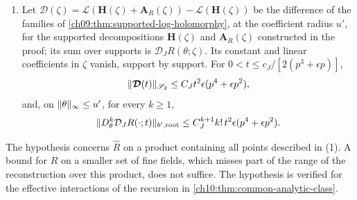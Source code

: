 \begin{lemma}
\begin{enumerate}
\item Let $\boldsymbol{\mathcal D}(\zeta)=\boldsymbol{\mathcal L}(\boldsymbol H(\zeta)+\boldsymbol A_R(\zeta))-\boldsymbol{\mathcal L}(\boldsymbol H(\zeta))$ be the difference of the families of \cref{ch09:thm:supported-log-holomorphy}, at the coefficient radius $u'$, for the supported decompositions $\boldsymbol H(\zeta)$ and $\boldsymbol A_R(\zeta)$ constructed in the proof; its sum over supports is $\mathcal D_JR(\theta;\zeta)$. Its constant and linear coefficients in $\zeta$ vanish, support by support. For $0<t\le c_J/[2(p^3+\epsilon p)]$,
\[
 \lVert \boldsymbol{\mathcal D}(t)\rVert_{\mathscr S_2}\le C_Jt^2\epsilon(p^4+\epsilon p^2),
\]
and, on $\lVert \theta\rVert_\infty\le u'$, for every $k\ge1$,
\[
 \lVert D_\theta^k\mathcal D_JR(\cdot;t)\rVert_{b',\mathrm{root}}\le C_J^{k+1}k!\,t^2\epsilon(p^4+\epsilon p^2).
\]
\end{enumerate}
\end{lemma}

The hypothesis concerns $\widehat R$ on a product containing all points described in (1). A bound for $R$ on a smaller set of fine fields, which misses part of the range of the reconstruction over this product, does not suffice. The hypothesis is verified for the effective interactions of the recursion in \cref{ch10:thm:common-analytic-class}.

